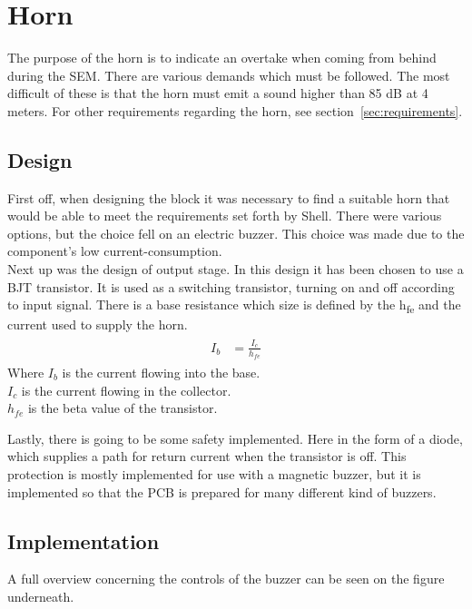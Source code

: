 \section{Horn}
The purpose of the horn is to indicate an overtake when coming from behind during the SEM. There are various demands which must be followed. The most difficult of these is that the horn must emit a sound higher than 85 dB at 4 meters. For other requirements regarding the horn, see section~\vref{sec:requirements}.  

\subsection{Design}
First off, when designing the block it was necessary to find a suitable horn that would be able to meet the requirements set forth by Shell. There were various options, but the choice fell on an electric buzzer. This choice was made due to the component's low current-consumption.\\
Next up was the design of output stage. In this design it has been chosen to use a BJT transistor. It is used as a switching transistor, turning on and off according to input signal. There is a base resistance which size is defined by the h\textsubscript{fe} and the current used to supply the horn.
\begin{align}
	\begin{split}
		I_b &= \frac{I_c}{h_{fe}}
	\end{split}
\end{align}
Where $I_b$ is the current flowing into the base. \\ 
$I_c$ is the current flowing in the collector. \\ 
$h_{fe}$ is the beta value of the transistor.

Lastly, there is going to be some safety implemented. Here in the form of a diode, which supplies a path for return current when the transistor is off. This protection is mostly implemented for use with a magnetic buzzer, but it is implemented so that the PCB is prepared for many different kind of buzzers.   

\newpage
\subsection{Implementation}
A full overview concerning the controls of the buzzer can be seen on the figure underneath.

